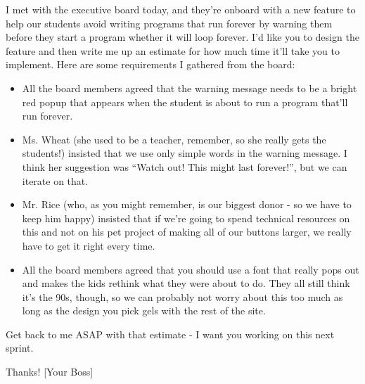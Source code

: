 \documentclass{report}
\newcommand*{\pts}[1]{\addtocounter{points}{#1}(#1pt)}
\begin{document}
\begin{spacing}{1.4}
\begin{enumerate}[leftmargin=*]
    I met with the executive board today, and they're onboard with a new feature to help our students avoid
    writing programs that run forever by warning them before they start a program whether it will loop forever.
    I'd like you to design the feature and then write me up an estimate for how much time it'll take you to
    implement. Here are some requirements I gathered from the board:
    \begin{itemize}
    \item All the board members agreed that the warning message needs to be a bright red popup that appears
      when the student is about to run a program that'll run forever.
    \item Ms. Wheat (she used to be a teacher, remember, so she really gets the students!) insisted that we
      use only simple words in the warning message. I think her suggestion was ``Watch out! This might last forever!'', but
      we can iterate on that.
    \item Mr. Rice (who, as you might remember, is our biggest donor - so we have to keep him happy) insisted that
      if we're going to spend technical resources on this and not on his pet project of making all of our buttons larger,
      we really have to get it right every time.
    \item All the board members agreed that you should use a font that really pops out and makes the kids rethink what
      they were about to do. They all still think it's the 90s, though, so we can probably not worry about this too much
      as long as the design you pick gels with the rest of the site.
    \end{itemize}

    Get back to me ASAP with that estimate - I want you working on this next sprint.

    Thanks!
    [Your Boss]
    
    





\end{enumerate}
\end{spacing}
\end{document}
